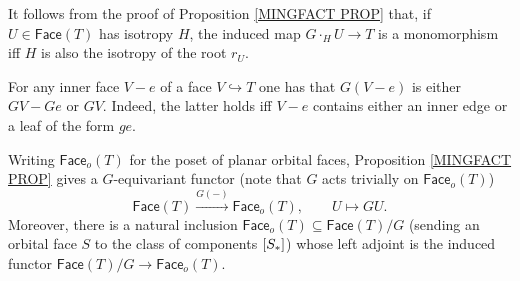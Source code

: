 \documentclass[a4paper,10pt
,draft
]{article}%
\begin{document}
\begin{remark}
	It follows from the proof of 
	Proposition \ref{MINGFACT PROP}
	that, if $U \in \mathsf{Face}(T)$ has isotropy $H$,
	the induced map 
	$G \cdot_H U \to T$ is a monomorphism iff
	$H$ is also the isotropy of the root $r_U$.
\end{remark}


\begin{remark}\label{GINNER REM}
	For any inner face $V-e$ 
	of a face $V \hookrightarrow T$ one has 
	that $G(V-e)$ is either $GV - Ge$ or $GV$.
	Indeed, the latter holds iff $V-e$ contains either an inner edge or a leaf of the form $ge$.
\end{remark}


\begin{remark}
Writing $\mathsf{Face}_o(T)$ for the poset of planar orbital faces, Proposition \ref{MINGFACT PROP} gives a $G$-equivariant functor (note that $G$ acts trivially on $\mathsf{Face}_o(T)$)
\[
	\mathsf{Face}(T) \xrightarrow{G(-)} \mathsf{Face}_o(T),
\qquad
	U \mapsto GU.
\]
Moreover, there is a natural inclusion
$\mathsf{Face}_o(T) \subseteq \mathsf{Face}(T)/G$ (sending an orbital face $S$ to the class of components $[S_{\**}]$)
whose left adjoint is the induced functor 
$\mathsf{Face}(T)/G \to \mathsf{Face}_o(T)$.
\end{remark}
\end{document}
